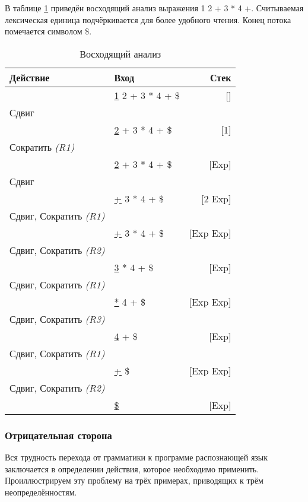 В таблице \ref{tbl:bottom-up_parsing} приведён восходящий анализ выражения 1 2
+ 3 * 4 +. Считываемая лексическая единица подчёркивается для более удобного
чтения. Конец потока помечается символом \$.

\begin{table}[hс]
	\caption{Восходящий анализ}
	\begin{center}
	\begin{tabular}{|l|l|r|}
	\hline
	Действие  & Вход & Стек \\
	\hline
	 & \underline{1} 2 + 3 * 4 + \$ & [] \\
	\hline
	Сдвиг & & \\
	\hline
	 & \underline{2} + 3 * 4 + \$ & [1] \\
	\hline
	Сократить {\it (R1)} & & \\
	\hline
	 & \underline{2} + 3 * 4 + \$ & [Exp] \\
	\hline
	Сдвиг & & \\
	\hline
	 & \underline{+} 3 * 4 + \$ & [2 Exp] \\
	\hline
	Сдвиг, Сократить {\it (R1)} & & \\
	\hline
	 & \underline{+} 3 * 4 + \$ & [Exp Exp] \\
	\hline
	Сдвиг, Сократить {\it (R2)} & & \\
	\hline
	 & \underline{3} * 4 + \$ & [Exp] \\
	\hline
	Сдвиг, Сократить {\it (R1)} & & \\
	\hline
	 & \underline{*} 4 + \$ & [Exp Exp] \\
	\hline
	Сдвиг, Сократить {\it (R3)} & & \\
	\hline
	 & \underline{4} + \$ & [Exp] \\
	\hline
	Сдвиг, Сократить {\it (R1)} & & \\
	\hline
	 & \underline{+} \$ & [Exp Exp] \\
	\hline
	Сдвиг, Сократить {\it (R2)} & & \\
	\hline
	 & \underline{\$} & [Exp] \\
	\hline
	\end{tabular}
	\end{center}
	\label{tbl:bottom-up_parsing}
\end{table}

\subsubsection{Отрицательная сторона}

Вся трудность перехода от грамматики к программе распознающей язык заключается в
определении действия, которое необходимо применить. Проиллюстрируем эту проблему
на трёх примерах, приводящих к трём неопределённостям.

